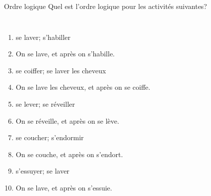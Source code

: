 \begin{frame}{Ordre logique}
  Quel est l'ordre logique pour les activités suivantes?
  \begin{columns}
      {\scriptsize
      \begin{enumerate}
        \item se laver; s'habiller
        \item<2->[$\to$] On se lave, et après on s'habille.
        \item<3-> se coiffer; se laver les cheveux
        \item<4->[$\to$] On se lave les cheveux, et après on se coiffe.
        \item<5-> se lever; se réveiller
        \item<6->[$\to$] On se réveille, et après on se lève.
        \item<7-> se coucher; s'endormir
        \item<8->[$\to$] On se couche, et après on s'endort.
        \item<9-> s'essuyer; se laver
        \item<10->[$\to$] On se lave, et après on s'essuie.
      \end{enumerate}
      }
      \begin{minipage}[c][0.6\textheight]{\linewidth}
        \begin{center}
        \end{center}
      \end{minipage}
  \end{columns}
\end{frame}